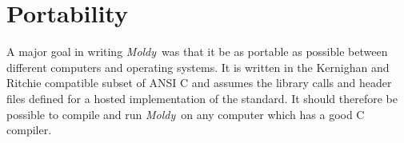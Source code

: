 \documentclass[a4paper,twoside]{report}
\newcommand{\moldy}{\emph{Moldy}}
\newcommand{\ie}{\emph{i.e.}}
\begin{document}
% 
% 
% 

\section{Portability}%
A major goal in writing \moldy\ was that it be as portable as possible
between different computers and operating systems.  It is written in
the Kernighan and Ritchie\cite{kernighan:78} compatible subset of ANSI
C and assumes the library calls and header files defined for a hosted
implementation of the standard.  It should therefore be possible to
compile and run \moldy\ on any computer which has a good C compiler.
\end{document}
